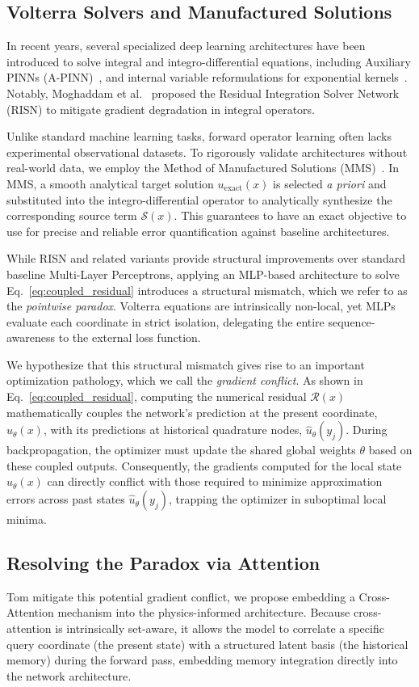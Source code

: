 \subsection{Volterra Solvers and Manufactured Solutions}

In recent years, several specialized deep learning architectures have been introduced to solve integral and integro-differential equations, including Auxiliary PINNs (A-PINN)~\cite{yuan2022apinn}, and internal variable reformulations for exponential kernels~\cite{Jang_2026}. Notably, Moghaddam et al.~\cite{moghaddam2025risn} proposed the Residual Integration Solver Network (RISN) to mitigate gradient degradation in integral operators.

Unlike standard machine learning tasks, forward operator learning often lacks experimental observational datasets. To rigorously validate architectures without real-world data, we employ the Method of Manufactured Solutions (MMS)~\cite{moghaddam2025risn}. In MMS, a smooth analytical target solution $u_{\text{exact}}(x)$ is selected \textit{a priori} and substituted into the integro-differential operator to analytically synthesize the corresponding source term $\mathcal{S}(x)$. 
This guarantees to have an exact objective to use for precise and reliable error quantification against baseline architectures.

While RISN and related variants provide structural improvements over standard baseline Multi-Layer Perceptrons, applying an MLP-based architecture to solve Eq.~\eqref{eq:coupled_residual} introduces a structural mismatch, which we refer to as the \textit{pointwise paradox}. Volterra equations are intrinsically non-local, yet MLPs evaluate each coordinate in strict isolation, delegating the entire sequence-awareness to the external loss function.

We hypothesize that this structural mismatch gives rise to an important optimization pathology, which we call the \textit{gradient conflict}. As shown in Eq.~\eqref{eq:coupled_residual}, computing the numerical residual $\mathcal{R}(x)$ mathematically couples the network's prediction at the present coordinate, $\hat{u}_\theta(x)$, with its predictions at historical quadrature nodes, $\hat{u}_\theta(y_j)$. During backpropagation, the optimizer must update the shared global weights $\theta$ based on these coupled outputs. Consequently, the gradients computed for the local state $\hat{u}_\theta(x)$ can directly conflict with those required to minimize approximation errors across past states $\hat{u}_\theta(y_j)$, trapping the optimizer in suboptimal local minima.

\subsection{Resolving the Paradox via Attention}
Tom mitigate this potential gradient conflict, we propose embedding a Cross-Attention mechanism into the physics-informed architecture. Because cross-attention is intrinsically set-aware, it allows the model to correlate a specific query coordinate (the present state) with a structured latent basis (the historical memory) during the forward pass, embedding memory integration directly into the network architecture.